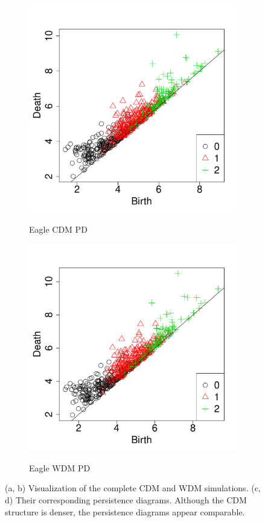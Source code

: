 \documentclass[12pt]{article}
\begin{document}
\begin{figure}[htp!]
\begin{subfigure}{0.24\textwidth}
    \label{fig:eagleDiagsB}
  \end{subfigure}
  \begin{subfigure}{0.24\textwidth}
    \caption{Eagle CDM PD}
    \includegraphics[width=\linewidth]{figure_11_cdm_pd.pdf}
    \label{fig:eagleDiagsC}
  \end{subfigure}
  \begin{subfigure}{0.24\textwidth}
    \caption{Eagle WDM PD}
    \includegraphics[width=\linewidth]{figure_11_wdm_pd.pdf}
    \label{fig:eagleDiagsD}
  \end{subfigure}
  \caption{(a, b) Visualization of the complete CDM and WDM simulations. (c, d) Their corresponding persistence diagrams. Although the CDM structure is denser, the persistence diagrams appear comparable.}


\end{figure}
\end{document}
